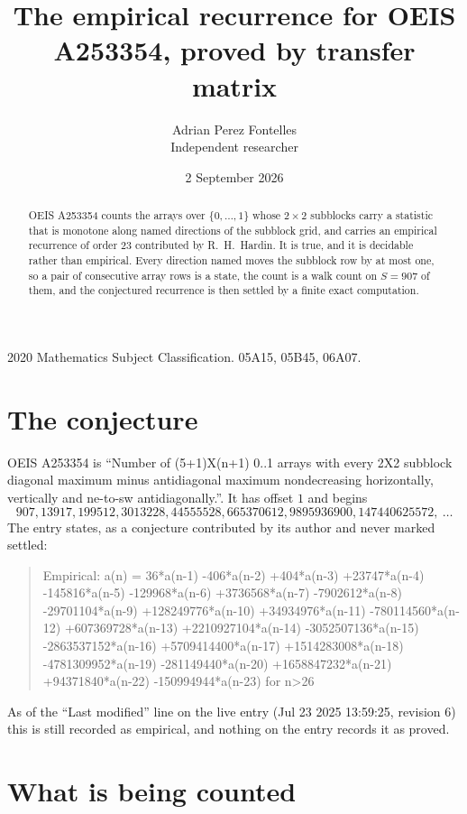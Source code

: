 \documentclass[11pt,a4paper]{article}
\title{The empirical recurrence for OEIS A253354, proved by transfer matrix}
\author{Adrian Perez Fontelles\\ \small Independent researcher}
\date{2 September 2026}
\theoremstyle{plain}
\theoremstyle{definition}
\begin{document}
\maketitle

\begin{abstract}
OEIS A253354 counts the arrays over $\{0,\dots,1\}$ whose $2\times2$ subblocks carry a
statistic that is monotone along named directions of the subblock grid, and carries an
empirical recurrence of order $23$ contributed by R.~H.~Hardin. It is true, and it is
decidable rather than empirical. Every direction named moves the subblock row by at most one,
so a pair of consecutive array rows is a state, the count is a walk count on $S=907$ of them,
and the conjectured recurrence is then settled by a finite exact computation.
\end{abstract}

\noindent\small 2020 Mathematics Subject Classification. 05A15, 05B45, 06A07.\normalsize

\section{The conjecture}

OEIS A253354 is ``Number of (5+1)X(n+1) 0..1 arrays with every 2X2 subblock diagonal maximum minus antidiagonal maximum nondecreasing horizontally, vertically and ne-to-sw antidiagonally.''. It has offset $1$ and begins
\[
907, 13917, 199512, 3013228, 44555528, 665370612, 9895936900, 147440625572,\ \dots
\]
The entry states, as a conjecture contributed by its author and never marked settled:
\begin{quote}
Empirical: a(n) = 36*a(n-1) -406*a(n-2) +404*a(n-3) +23747*a(n-4) -145816*a(n-5) -129968*a(n-6) +3736568*a(n-7) -7902612*a(n-8) -29701104*a(n-9) +128249776*a(n-10) +34934976*a(n-11) -780114560*a(n-12) +607369728*a(n-13) +2210927104*a(n-14) -3052507136*a(n-15) -2863537152*a(n-16) +5709414400*a(n-17) +1514283008*a(n-18) -4781309952*a(n-19) -281149440*a(n-20) +1658847232*a(n-21) +94371840*a(n-22) -150994944*a(n-23) for n>26
\end{quote}
As of the ``Last modified'' line on the live entry (Jul 23 2025 13:59:25, revision 6) this is still
recorded as empirical, and nothing on the entry records it as proved.

\section{What is being counted}
\end{document}
